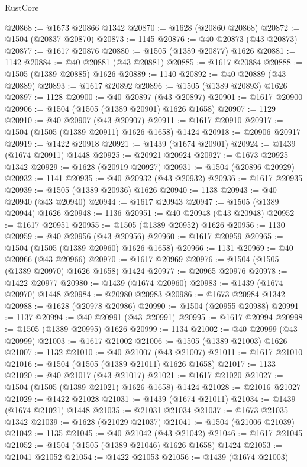 \begin{lexlean}{RustCore}
\begin{coremodule}
@20868 := @1673 @20866 @1342
@20870 := @1628 (@20860 @20868)
@20872 := @1504 (@20837 @20870)
@20873 := 1145
@20876 := @40 @20873 (@43 @20873)
@20877 := @1617 @20876
@20880 := @1505 (@1389 @20877) @1626
@20881 := 1142
@20884 := @40 @20881 (@43 @20881)
@20885 := @1617 @20884
@20888 := @1505 (@1389 @20885) @1626
@20889 := 1140
@20892 := @40 @20889 (@43 @20889)
@20893 := @1617 @20892
@20896 := @1505 (@1389 @20893) @1626
@20897 := 1128
@20900 := @40 @20897 (@43 @20897)
@20901 := @1617 @20900
@20906 := @1504 (@1505 (@1389 @20901) @1626 @1658)
@20907 := 1129
@20910 := @40 @20907 (@43 @20907)
@20911 := @1617 @20910
@20917 := @1504 (@1505 (@1389 @20911) @1626 @1658) @1424
@20918 := @20906 @20917
@20919 := @1422 @20918
@20921 := @1439 (@1674 @20901)
@20924 := @1439 (@1674 @20911) @1448
@20925 := @20921 @20924
@20927 := @1673 @20925 @1342
@20929 := @1628 (@20919 @20927)
@20931 := @1504 (@20896 @20929)
@20932 := 1141
@20935 := @40 @20932 (@43 @20932)
@20936 := @1617 @20935
@20939 := @1505 (@1389 @20936) @1626
@20940 := 1138
@20943 := @40 @20940 (@43 @20940)
@20944 := @1617 @20943
@20947 := @1505 (@1389 @20944) @1626
@20948 := 1136
@20951 := @40 @20948 (@43 @20948)
@20952 := @1617 @20951
@20955 := @1505 (@1389 @20952) @1626
@20956 := 1130
@20959 := @40 @20956 (@43 @20956)
@20960 := @1617 @20959
@20965 := @1504 (@1505 (@1389 @20960) @1626 @1658)
@20966 := 1131
@20969 := @40 @20966 (@43 @20966)
@20970 := @1617 @20969
@20976 := @1504 (@1505 (@1389 @20970) @1626 @1658) @1424
@20977 := @20965 @20976
@20978 := @1422 @20977
@20980 := @1439 (@1674 @20960)
@20983 := @1439 (@1674 @20970) @1448
@20984 := @20980 @20983
@20986 := @1673 @20984 @1342
@20988 := @1628 (@20978 @20986)
@20990 := @1504 (@20955 @20988)
@20991 := 1137
@20994 := @40 @20991 (@43 @20991)
@20995 := @1617 @20994
@20998 := @1505 (@1389 @20995) @1626
@20999 := 1134
@21002 := @40 @20999 (@43 @20999)
@21003 := @1617 @21002
@21006 := @1505 (@1389 @21003) @1626
@21007 := 1132
@21010 := @40 @21007 (@43 @21007)
@21011 := @1617 @21010
@21016 := @1504 (@1505 (@1389 @21011) @1626 @1658)
@21017 := 1133
@21020 := @40 @21017 (@43 @21017)
@21021 := @1617 @21020
@21027 := @1504 (@1505 (@1389 @21021) @1626 @1658) @1424
@21028 := @21016 @21027
@21029 := @1422 @21028
@21031 := @1439 (@1674 @21011)
@21034 := @1439 (@1674 @21021) @1448
@21035 := @21031 @21034
@21037 := @1673 @21035 @1342
@21039 := @1628 (@21029 @21037)
@21041 := @1504 (@21006 @21039)
@21042 := 1135
@21045 := @40 @21042 (@43 @21042)
@21046 := @1617 @21045
@21052 := @1504 (@1505 (@1389 @21046) @1626 @1658) @1424
@21053 := @21041 @21052
@21054 := @1422 @21053
@21056 := @1439 (@1674 @21003)

\end{coremodule}
\end{lexlean}
